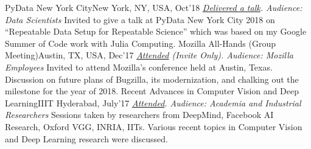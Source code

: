 \begin{talks}
    \talk
	{PyData New York City}{New York, NY, USA, Oct'18}
	{\textit{\href{https://doi.org/10.6084/m9.figshare.7227875.v1}{Delivered a talk}. Audience: Data Scientists}}
	{Invited to give a talk at PyData New York City 2018 on ``Repeatable Data Setup for Repeatable Science” which was based on my Google Summer of Code work with Julia Computing.}
	\talk
	{Mozilla All-Hands (Group Meeting)}{Austin, TX, USA, Dec'17}
	{\textit{\href{https://wiki.mozilla.org/All_Hands/Austin}{Attended} (Invite Only). Audience: Mozilla Employees}}
	{Invited to attend Mozilla's conference held at Austin, Texas. Discussion on future plans of Bugzilla, its modernization, and chalking out the milestone for the year of 2018.}
	\talk
	{Recent Advances in Computer Vision and Deep Learning}{IIIT Hyderabad, July'17}
	{\textit{\href{http://cvit.iiit.ac.in/mlsummerschool2017/}{Attended}. Audience: Academia and Industrial Researchers}}
	{Sessions taken by researchers from DeepMind, Facebook AI Research, Oxford VGG, INRIA, IITs. Various recent topics in Computer Vision and Deep Learning research were discussed.}
\end{talks}    
\vspace{-3mm}

